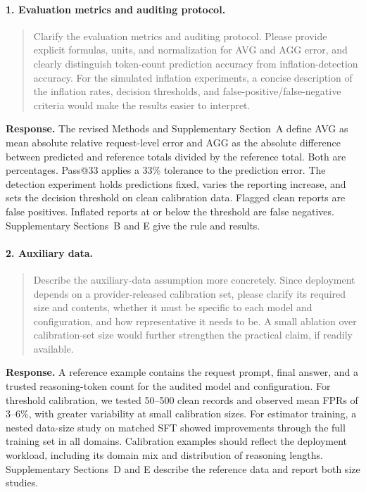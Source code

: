 \documentclass[11pt]{article}
\begin{document}
\paragraph{1. Evaluation metrics and auditing protocol.}
\begin{quote}\small
Clarify the evaluation metrics and auditing protocol. Please provide explicit formulas, units, and normalization for AVG and AGG error, and clearly distinguish token-count prediction accuracy from inflation-detection accuracy. For the simulated inflation experiments, a concise description of the inflation rates, decision thresholds, and false-positive/false-negative criteria would make the results easier to interpret.
\end{quote}
\textbf{Response.} The revised Methods and Supplementary Section~A define AVG as mean absolute relative request-level error and AGG as the absolute difference between predicted and reference totals divided by the reference total. Both are percentages. Pass@33 applies a 33\% tolerance to the prediction error. The detection experiment holds predictions fixed, varies the reporting increase, and sets the decision threshold on clean calibration data. Flagged clean reports are false positives. Inflated reports at or below the threshold are false negatives. Supplementary Sections~B and E give the rule and results.

\paragraph{2. Auxiliary data.}
\begin{quote}\small
Describe the auxiliary-data assumption more concretely. Since deployment depends on a provider-released calibration set, please clarify its required size and contents, whether it must be specific to each model and configuration, and how representative it needs to be. A small ablation over calibration-set size would further strengthen the practical claim, if readily available.
\end{quote}
\textbf{Response.} A reference example contains the request prompt, final answer, and a trusted reasoning-token count for the audited model and configuration. For threshold calibration, we tested 50--500 clean records and observed mean FPRs of 3--6\%, with greater variability at small calibration sizes. For estimator training, a nested data-size study on matched SFT showed improvements through the full training set in all domains. Calibration examples should reflect the deployment workload, including its domain mix and distribution of reasoning lengths. Supplementary Sections~D and E describe the reference data and report both size studies.
\end{document}
